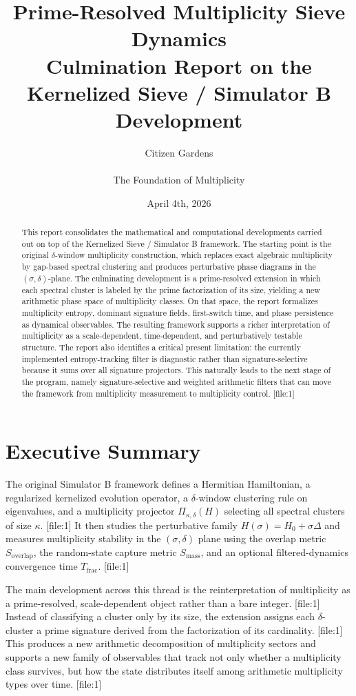 \documentclass[11pt]{article}
\title{Prime-Resolved Multiplicity Sieve Dynamics\\\large Culmination Report on the Kernelized Sieve / Simulator B Development}
\date{April 4th, 2026}
\author{Citizen Gardens \\ \\ The Foundation of Multiplicity}
\begin{document}
\maketitle

\begin{abstract}
This report consolidates the mathematical and computational developments carried out on top of the Kernelized Sieve / Simulator B framework. The starting point is the original $\delta$-window multiplicity construction, which replaces exact algebraic multiplicity by gap-based spectral clustering and produces perturbative phase diagrams in the $(\sigma,\delta)$-plane. The culminating development is a prime-resolved extension in which each spectral cluster is labeled by the prime factorization of its size, yielding a new arithmetic phase space of multiplicity classes. On that space, the report formalizes multiplicity entropy, dominant signature fields, first-switch time, and phase persistence as dynamical observables. The resulting framework supports a richer interpretation of multiplicity as a scale-dependent, time-dependent, and perturbatively testable structure. The report also identifies a critical present limitation: the currently implemented entropy-tracking filter is diagnostic rather than signature-selective because it sums over all signature projectors. This naturally leads to the next stage of the program, namely signature-selective and weighted arithmetic filters that can move the framework from multiplicity measurement to multiplicity control. [file:1]
\end{abstract}

\section{Executive Summary}

The original Simulator B framework defines a Hermitian Hamiltonian, a regularized kernelized evolution operator, a $\delta$-window clustering rule on eigenvalues, and a multiplicity projector $\Pi_{\kappa,\delta}(H)$ selecting all spectral clusters of size $\kappa$. [file:1] It then studies the perturbative family $H(\sigma)=H_0+\sigma\Delta$ and measures multiplicity stability in the $(\sigma,\delta)$ plane using the overlap metric $S_{\mathrm{overlap}}$, the random-state capture metric $S_{\mathrm{mass}}$, and an optional filtered-dynamics convergence time $T_{\mathrm{frac}}$. [file:1]

The main development across this thread is the reinterpretation of multiplicity as a prime-resolved, scale-dependent object rather than a bare integer. [file:1] Instead of classifying a cluster only by its size, the extension assigns each $\delta$-cluster a prime signature derived from the factorization of its cardinality. [file:1] This produces a new arithmetic decomposition of multiplicity sectors and supports a new family of observables that track not only whether a multiplicity class survives, but how the state distributes itself among arithmetic multiplicity types over time. [file:1]
\end{document}
